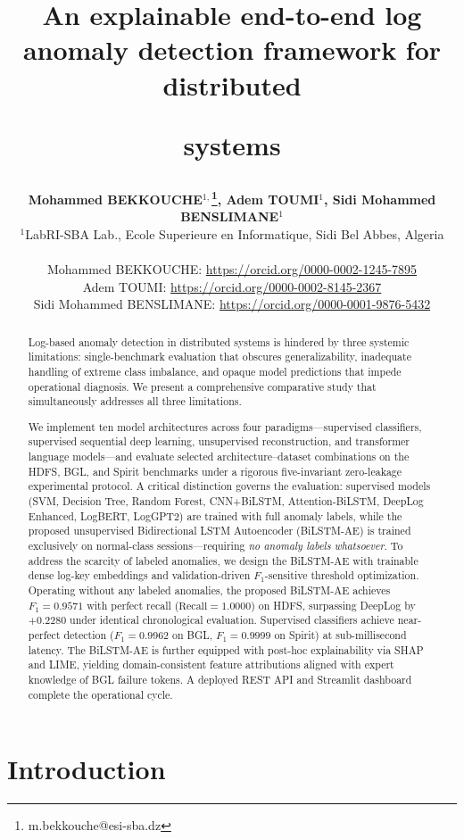 \documentclass{elektr}
\title{An explainable end-to-end log anomaly detection framework for distributed

systems}
\author[BEKKOUCHE et al.]{
	\textbf{Mohammed BEKKOUCHE$^{1,}$\thanks{m.bekkouche@esi-sba.dz}, Adem TOUMI$^{1}$, Sidi Mohammed BENSLIMANE$^{1}$}\\
	$^{1}$LabRI-SBA Lab., Ecole Superieure en Informatique, Sidi Bel Abbes, Algeria\\\\
	Mohammed BEKKOUCHE: \url{https://orcid.org/0000-0002-1245-7895} \\
	Adem TOUMI: \url{https://orcid.org/0000-0002-8145-2367} \\
	Sidi Mohammed BENSLIMANE: \url{https://orcid.org/0000-0001-9876-5432}\\ [1.8em]
	\rec{12.06.2026}
	\acc{28.06.2026}
	\finv{}
}
\begin{document}
\maketitle

\begin{abstract}
Log-based anomaly detection in distributed systems is hindered by three systemic
limitations: single-benchmark evaluation that obscures generalizability, inadequate
handling of extreme class imbalance, and opaque model predictions that impede
operational diagnosis. We present a comprehensive comparative study that simultaneously
addresses all three limitations.

We implement ten model architectures across four paradigms---supervised classifiers,
supervised sequential deep learning, unsupervised reconstruction, and transformer
language models---and evaluate selected architecture--dataset combinations on the
HDFS, BGL, and Spirit benchmarks under a rigorous five-invariant zero-leakage
experimental protocol. A critical distinction governs the evaluation: supervised
models (SVM, Decision Tree, Random Forest, CNN+BiLSTM, Attention-BiLSTM,
DeepLog Enhanced, LogBERT, LogGPT2) are trained with full anomaly labels, while
the proposed unsupervised Bidirectional LSTM Autoencoder (BiLSTM-AE) is trained
exclusively on normal-class sessions---requiring \emph{no anomaly labels whatsoever}.
To address the scarcity of labeled anomalies, we design the BiLSTM-AE with trainable
dense log-key embeddings and validation-driven $F_1$-sensitive threshold optimization.
Operating without any labeled anomalies, the proposed BiLSTM-AE achieves
$F_1{=}0.9571$ with perfect recall ($\text{Recall}{=}1.0000$) on HDFS, surpassing
DeepLog by $+0.2280$ under identical chronological evaluation. Supervised classifiers
achieve near-perfect detection ($F_1{=}0.9962$ on BGL, $F_1{=}0.9999$ on Spirit)
at sub-millisecond latency. The BiLSTM-AE is further equipped with post-hoc
explainability via SHAP and LIME, yielding domain-consistent feature attributions
aligned with expert knowledge of BGL failure tokens. A deployed REST API and
Streamlit dashboard complete the operational cycle.
\end{abstract}

\section{Introduction}
\label{Sec:Intro}
\end{document}

